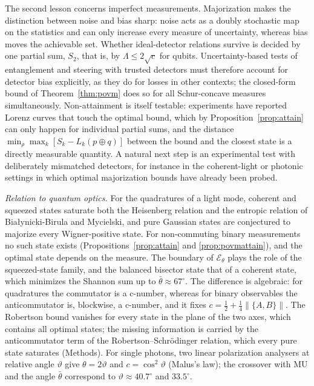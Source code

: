 \documentclass[11pt]{article}
\theoremstyle{definition}
\newcommand{\sqc}{\sqrt{c}}
\begin{document}
The second lesson concerns imperfect measurements. Majorization makes the
distinction between noise and bias sharp: noise acts as a doubly stochastic map
on the statistics and can only increase every measure of uncertainty, whereas
bias moves the achievable set. Whether ideal-detector relations survive is
decided by one partial sum, $S_2$, that is, by $\Lambda\le2\sqc$ for qubits.
Uncertainty-based tests of entanglement and steering with trusted detectors
must therefore account for detector bias explicitly, as they do for losses in
other contexts; the closed-form bound of Theorem~\ref{thm:povm} does so for all
Schur-concave measures simultaneously. Non-attainment is itself testable: experiments
have reported Lorenz curves that touch the optimal bound\cite{Wang2020}, which by
Proposition~\ref{prop:attain} can only happen for individual partial sums, and the
distance $\min_\rho\max_k[S_k-L_k(p\oplus q)]$ between the bound and the closest state is
a directly measurable quantity. A natural next step is an experimental
test with deliberately mismatched detectors, for instance in the
coherent-light\cite{Wang2020} or photonic\cite{Yuan2023} settings in which
optimal majorization bounds have already been probed.

\emph{Relation to quantum optics.} For the quadratures of a light mode, coherent
and squeezed states saturate both the Heisenberg relation and the entropic
relation of Bia{\l}ynicki-Birula and Mycielski\cite{BBM1975}, and pure Gaussian
states are conjectured to majorize every Wigner-positive state\cite{VanHerstraeten2023}.
For non-commuting binary measurements no such state exists
(Propositions~\ref{prop:attain} and \ref{prop:povmattain}), and the optimal state
depends on the measure\cite{KorzekwaLostaglio2016,LuisBosykPortesi2016}. The
boundary of $\mathcal E_\theta$ plays the role of the squeezed-state family, and the
balanced bisector state that of a coherent state, which minimizes the Shannon
sum up to $\bar\theta\approx67^\circ$. The difference is algebraic: for quadratures
the commutator is a c-number, whereas for binary observables the anticommutator
is, blockwise, a c-number, and it fixes $c=\frac12+\frac14\|\{A,B\}\|$. The Robertson
bound vanishes for every state in the plane of the two axes, which contains all
optimal states; the missing information is carried by the anticommutator term
of the Robertson--Schr\"odinger relation, which every pure state saturates
(Methods). For single photons, two linear polarization analysers at relative
angle $\vartheta$ give $\theta=2\vartheta$ and $c=\cos^2\vartheta$ (Malus's law); the
crossover with MU and the angle $\bar\theta$ correspond to $\vartheta\approx40.7^\circ$ and
$33.5^\circ$.
\end{document}
